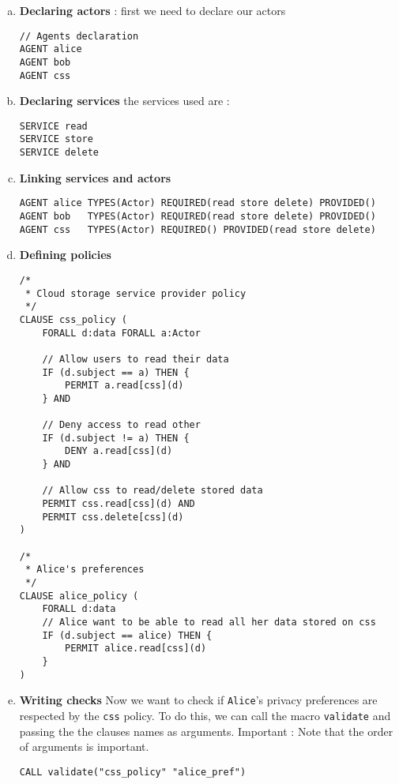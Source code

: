 \begin{enumerate}[a.]

    \item \textbf{Declaring actors} : first we need to declare our actors
\begin{lstlisting}
// Agents declaration
AGENT alice
AGENT bob
AGENT css
\end{lstlisting}

    \item \textbf{Declaring services} the services used are :
\begin{lstlisting}
SERVICE read
SERVICE store
SERVICE delete
\end{lstlisting}

    \item \textbf{Linking services and actors}
\begin{lstlisting}
AGENT alice TYPES(Actor) REQUIRED(read store delete) PROVIDED()
AGENT bob   TYPES(Actor) REQUIRED(read store delete) PROVIDED()
AGENT css   TYPES(Actor) REQUIRED() PROVIDED(read store delete)
\end{lstlisting}


    \item \textbf{Defining policies}
\begin{lstlisting}
/*
 * Cloud storage service provider policy
 */
CLAUSE css_policy (
    FORALL d:data FORALL a:Actor

    // Allow users to read their data
    IF (d.subject == a) THEN {
        PERMIT a.read[css](d)
    } AND

    // Deny access to read other
    IF (d.subject != a) THEN {
        DENY a.read[css](d)
    } AND

    // Allow css to read/delete stored data
    PERMIT css.read[css](d) AND
    PERMIT css.delete[css](d)
)

/*
 * Alice's preferences
 */
CLAUSE alice_policy (
    FORALL d:data
    // Alice want to be able to read all her data stored on css
    IF (d.subject == alice) THEN {
        PERMIT alice.read[css](d)
    }
)
\end{lstlisting}

    \item \textbf{Writing checks}
Now we want to check if \texttt{Alice}'s privacy preferences are respected by the \texttt{css} policy.
To do this, we can call the macro \texttt{validate} and passing the the clauses names as arguments.
Important : Note that the order of arguments is important.
\begin{lstlisting}
CALL validate("css_policy" "alice_pref")
\end{lstlisting}

\end{enumerate}


